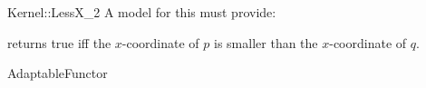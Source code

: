 \begin{ccRefFunctionObjectConcept}{Kernel::LessX_2}
A model for this must provide:


{returns true iff the $x$-coordinate of $p$ is smaller than the
$x$-coordinate of $q$.}

\ccRefines
AdaptableFunctor

\ccSeeAlso
{}\\

\end{ccRefFunctionObjectConcept}
